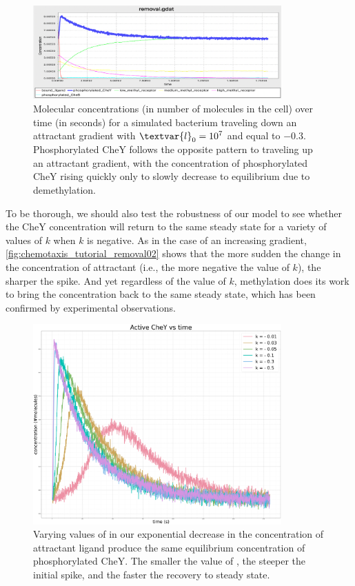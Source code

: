 \begin{figure}[h]
\centering
\mySfFamily
\includegraphics[width = 0.85\textwidth]{../images/chemotaxis_tutorial_removal01.png}
\caption{Molecular concentrations (in number of molecules in the cell) over time (in seconds) for a simulated bacterium traveling down an attractant gradient with $\textvar{l}_\text{0} = \text{10}^\text{7}$ and  equal to $-\text{0.3}$. Phosphorylated CheY follows the opposite pattern to traveling up an attractant gradient, with the concentration of phosphorylated CheY rising quickly only to slowly decrease to equilibrium due to demethylation.}
\label{fig:chemotaxis_tutorial_removal01}
\end{figure}


To be thorough, we should also test the robustness of our model to see whether the CheY concentration will return to the same steady state for a variety of values of $k$ when $k$ is negative. As in the case of an increasing gradient, \autoref{fig:chemotaxis_tutorial_removal02} shows that the more sudden the change in the concentration of attractant (i.e., the more negative the value of $k$), the sharper the spike. And yet regardless of the value of $k$, methylation does its work to bring the concentration back to the same steady state, which has been confirmed by experimental observations.\\

\begin{figure}[h]
\centering
\mySfFamily
\includegraphics[width = 0.85\textwidth]{../images/chemotaxis_tutorial_removal02.png}
\caption{Varying values of  in our exponential decrease in the concentration of attractant ligand produce the same equilibrium concentration of phosphorylated CheY. The smaller the value of , the steeper the initial spike, and the faster the recovery to steady state.}
\label{fig:chemotaxis_tutorial_removal02}
\end{figure}

